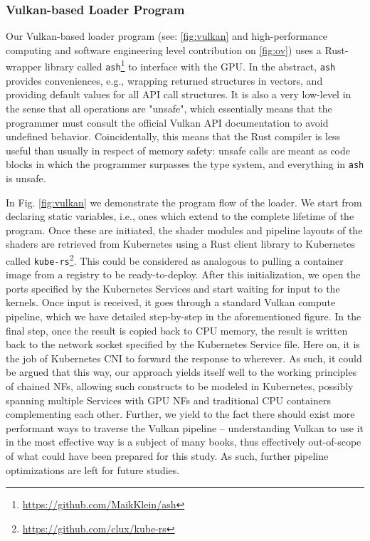 \documentclass{IEEEtran}
\begin{document}
\subsubsection{Vulkan-based Loader Program}
\label{ch:loader}

Our Vulkan-based loader program (see: \ref{fig:vulkan} and high-performance computing and software engineering level contribution on \ref{fig:ov}) uses a Rust-wrapper library called \verb|ash|\footnote{\url{https://github.com/MaikKlein/ash}} to interface with the GPU. In the abstract, \verb|ash| provides conveniences, e.g., wrapping returned structures in vectors, and providing default values for all API call structures. It is also a very low-level in the sense that all operations are "unsafe", which essentially means that the programmer must consult the official Vulkan API documentation to avoid undefined behavior. Coincidentally, this means that the Rust compiler is less useful than usually in respect of memory safety: unsafe calls are meant as code blocks in which the programmer surpasses the type system, and everything in \verb|ash| is unsafe.

In Fig. \ref{fig:vulkan} we demonstrate the program flow of the loader. We start from declaring static variables, i.e., ones which extend to the complete lifetime of the program. Once these are initiated, the shader modules and pipeline layouts of the shaders are retrieved from Kubernetes using a Rust client library to Kubernetes called \verb|kube-rs|\footnote{\url{https://github.com/clux/kube-rs}}. This could be considered as analogous to pulling a container image from a registry to be ready-to-deploy. After this initialization, we open the ports specified by the Kubernetes Services and start waiting for input to the kernels. Once input is received, it goes through a standard Vulkan compute pipeline, which we have detailed step-by-step in the aforementioned figure. In the final step, once the result is copied back to CPU memory, the result is written back to the network socket specified by the Kubernetes Service file. Here on, it is the job of Kubernetes CNI to forward the response to wherever. As such, it could be argued that this way, our approach yields itself well to the working principles of chained NFs, allowing such constructs to be modeled in Kubernetes, possibly spanning multiple Services with GPU NFs and traditional CPU containers complementing each other. Further, we yield to the fact there should exist more performant ways to traverse the Vulkan pipeline -- understanding Vulkan to use it in the most effective way is a subject of many books, thus effectively out-of-scope of what could have been prepared for this study. As such, further pipeline optimizations are left for future studies.
\end{document}
